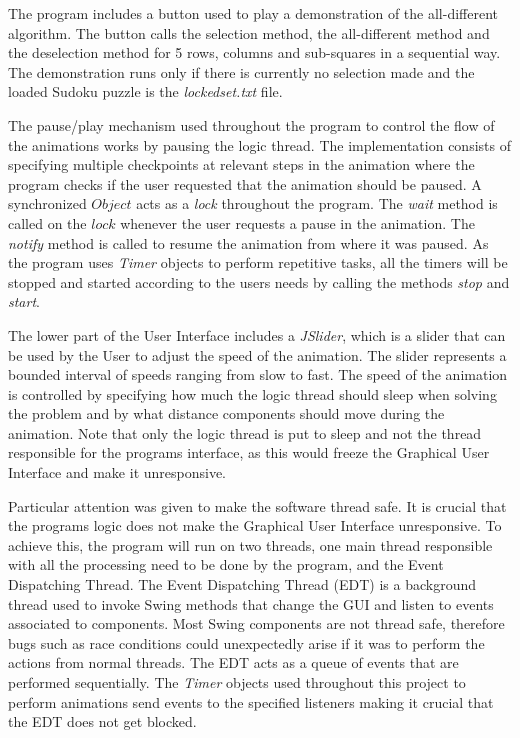 \documentclass{l4proj}
\begin{document}
\noindent The program includes a button used to play a demonstration of the all-different algorithm. The button calls the selection method, the all-different method and the deselection method for 5 rows, columns and sub-squares in a sequential way. The demonstration runs only if there is currently no selection made and the loaded Sudoku puzzle is the \textit{lockedset.txt} file.

\noindent The pause/play mechanism used throughout the program to control the flow of the animations works by pausing the logic thread. The implementation consists of specifying multiple checkpoints at relevant steps in the animation where the program checks if the user requested that the animation should be paused. A synchronized $Object$ acts as a \textit{lock} throughout the program. The \textit{wait} method is called on the $lock$ whenever the user requests a pause in the animation. The \textit{notify} method is called to resume the animation from where it was paused. As the program uses \textit{Timer} objects to perform repetitive tasks, all the timers will be stopped and started according to the user\textquotesingle s needs by calling the methods \textit{stop} and \textit{start}.

\noindent The lower part of the User Interface includes a \textit{JSlider}, which is a slider that can be used by the User to adjust the speed of the animation. The slider represents a bounded interval of speeds ranging from slow to fast. The speed of the animation is controlled by specifying how much the logic thread should sleep when solving the problem and by what distance components should move during the animation. Note that only the logic thread is put to sleep and not the thread responsible for the program\textquotesingle s interface, as this would freeze the Graphical User Interface and make it unresponsive.

\noindent Particular attention was given to make the software thread safe. It is crucial that the program\textquotesingle s logic does not make the Graphical User Interface unresponsive. To achieve this, the program will run on two threads, one main thread responsible with all the processing need to be done by the program, and the Event Dispatching Thread. The Event Dispatching Thread (EDT) is a background thread used to invoke Swing methods that change the GUI and listen to events associated to components. Most Swing components are not thread safe, therefore bugs such as race conditions could unexpectedly arise if it was to perform the actions from normal threads. The EDT acts as a queue of events that are performed sequentially. The \textit{Timer} objects used throughout this project to perform animations send events to the specified listeners making it crucial that the EDT does not get blocked.
\end{document}
